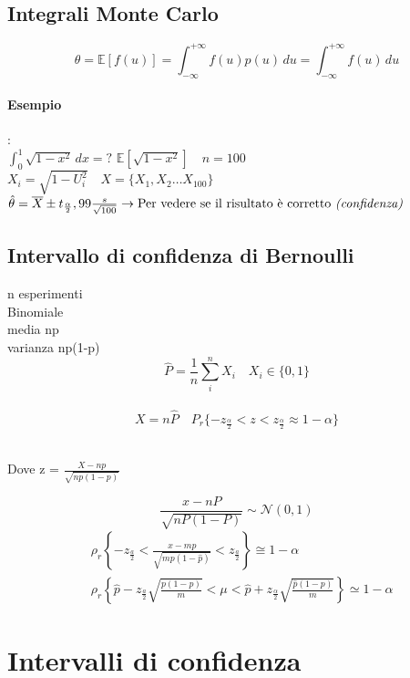 \documentclass[]{article}
\newcommand{\ev}{\mathbb{E}[X]}
\renewcommand{\ev}[1]{\mathbb{E}[#1]}
\begin{document}
    \subsection{Integrali Monte Carlo}
    \[ \theta = \ev{f(u)} = \int_{-\infty}^{+\infty} f(u) p(u) \, du = \int_{-\infty}^{+\infty} f(u) \, du \]
    \paragraph{Esempio}: \\
    $\int_{0}^{1} \sqrt{1-x^2} \,dx = ?$
    $\ev{\sqrt{1-x^2}} \quad n = 100$ \\
    $X_i = \sqrt{1 - U_i^2} \quad X = \{ X_1, X_2 \ldots X_100 \}$ \\
    $\hat{\theta} = \overline{X} \pm t_{\frac{\alpha}{2}}, 99 \frac{s}{\sqrt{100}} \rightarrow \text{Per vedere se il risultato è corretto \textit{(confidenza)}}$ 
    \subsection{Intervallo di confidenza di Bernoulli}
    n esperimenti \\
    Binomiale \\
    media np \\
    varianza np(1-p) \\
    \[ \hat{P} = \frac{1}{n} \sum_{i}^{n}X_i \quad X_i \in \{ 0, 1 \} \] \\
    \[ X = n\hat{P} \quad P_r \{ -z_{\frac{\alpha}{2}} < z < z_{\frac{\alpha}{2}} \approx 1-\alpha \}\] \\
    \centerline{Dove z = $\frac{X-np}{\sqrt{np(1-p)}}$}
    \[ \frac{x-nP}{\sqrt{nP(1-P)}} \sim \mathcal{N}(0,1)\]
    \begin{equation}
        \begin{aligned}
        & \rho_r\left\{-z_{\frac{a}{2}}<\frac{x-m p}{\sqrt{m p(1-\hat{p})}}<z_{\frac{a}{2}}\right\} \cong 1-\alpha \\
        & \rho_r\left\{\hat{p}-z_{\frac{a}{2}} \sqrt{\frac{p(1-p)}{m}}<\mu<\hat{p}+z_{\frac{\alpha}{2}} \sqrt{\frac{\hat{p}(1-p)}{m}}\right\} \simeq 1-\alpha
        \end{aligned}
    \end{equation}

    \section{Intervalli di confidenza}
\end{document}
